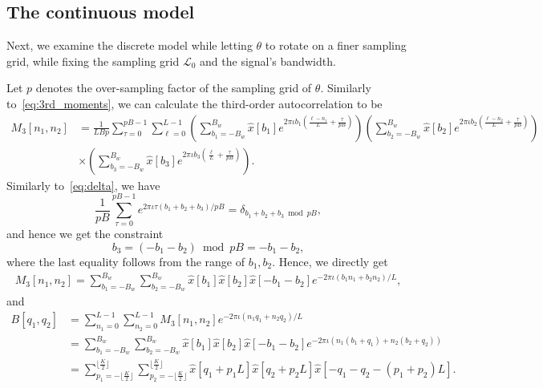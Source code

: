 \documentclass[english,12pt]{article}
\newcommand{\I}{\iota}
\newcommand{\tB}{B_w}
\numberwithin{equation}{section}
\numberwithin{thm}{section} %
\begin{document}
\subsection{The continuous model} \label{sec:analysis_continuous}

Next, we examine the discrete model while letting $\theta$ to rotate on a finer sampling grid, while fixing the sampling grid $\mathcal{L}_0$ and the signal's bandwidth.  

Let $p$ denotes the over-sampling factor of the sampling grid of $\theta$. Similarly to~\eqref{eq:3rd_moments}, we can calculate  the third-order autocorrelation to be
\begin{equation}
\begin{split}
M_3[n_1,n_2] 
&= \frac{1}{LBp}\sum_{\tau=0}^{pB-1}\sum_{\ell=0}^{L-1} 
\left(\sum_{b_1=-\tB}^{\tB}\hat{x}[b_1]e^{2\pi\I b_1 \left(\frac{\ell-n_1}{L} + \frac{\tau}{pB}\right) }\right) 
\left(\sum_{b_2=-\tB}^{\tB}\hat{x}[b_2]e^{2\pi\I b_2 \left(\frac{\ell-n_2}{L} + \frac{\tau}{pB}\right) } \right) \\
&\times \left(\sum_{b_3=-\tB}^{\tB}\hat{x}[b_3]e^{2\pi\I b_3 \left(\frac{\ell}{L} + \frac{\tau}{pB}\right) }\right). 
\end{split}
\end{equation}
Similarly to~\eqref{eq:delta}, we have
\begin{equation} \label{eq:delta2}
\frac{1}{pB}\sum_{\tau=0}^{pB-1}e^{2\pi\I\tau (b_1+b_2+b_3)/pB} = \delta_{b_1+b_2+b_3\bmod pB},
\end{equation}
and hence we get the constraint $$b_3=(-b_1-b_2)\bmod pB=-b_1-b_2,$$
where the last equality follows from the range of $b_1,b_2$.
Hence, we directly get 
\begin{equation} \label{eq:3rd_moment_zeros}
\begin{split}
M_3[n_1,n_2] = 
\sum_{b_1=-\tB}^{\tB}\sum_{b_2=-\tB}^{\tB}\hat{x}[b_1]\hat{x}[b_2]\hat{x}[-b_1-b_2]e^{-2\pi\I (b_1n_1 + b_2n_2)/L},
\end{split}
\end{equation}
and 
\begin{equation} \label{eq:mixed_bispectra_zeros}
\begin{split}
B[q_1,q_2] &= \sum_{n_1=0}^{L-1} \sum_{n_2=0}^{L-1}
M_3[n_1,n_2]e^{-2\pi\I(n_1q_1+n_2q_2)/L} \\ &= 
\sum_{b_1=-\tB}^{\tB}\sum_{b_2=-\tB}^{\tB}\hat{x}[b_1]\hat{x}[b_2]\hat{x}[-b_1-b_2]e^{-2\pi\I (n_1(b_1+q_1) + n_2(b_2+q_2))} \\ & =
  \sum_{p_1=-\lfloor\frac{K}{2} \rfloor}^{\lfloor\frac{K}{2}\rfloor} \sum_{p_2=-\lfloor\frac{K}{2}\rfloor}^{\lfloor\frac{K}{2}\rfloor} \hat{x}[q_1 + p_1L] \hat{x}[q_2 + p_2L]\hat{x}[-q_1-q_2 - (p_1+p_2)L].
\end{split}
\end{equation}
\end{document}
